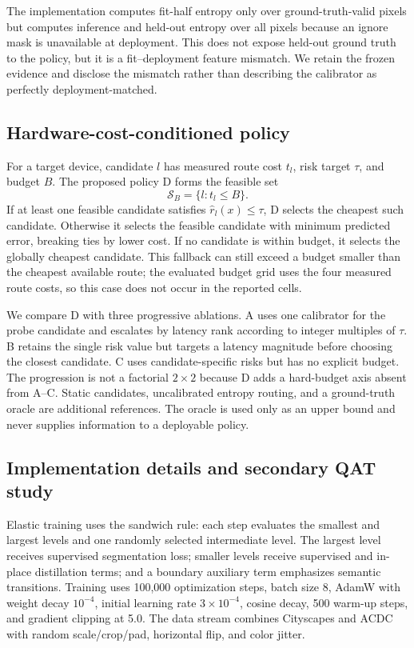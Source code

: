 \documentclass[a4paper,review,12pt]{elsarticle}
\begin{document}
The implementation computes fit-half entropy only over ground-truth-valid pixels but computes inference and held-out entropy over all pixels because an ignore mask is unavailable at deployment. This does not expose held-out ground truth to the policy, but it is a fit--deployment feature mismatch. We retain the frozen evidence and disclose the mismatch rather than describing the calibrator as perfectly deployment-matched.

\subsection{Hardware-cost-conditioned policy}
\label{sec:policy}

For a target device, candidate $l$ has measured route cost $t_l$, risk target $\tau$, and budget $B$. The proposed policy D forms the feasible set
\begin{equation}
\mathcal{S}_B=\{l:t_l\leq B\}.
\label{eq:feasible}
\end{equation}
If at least one feasible candidate satisfies $\widehat{r}_l(x)\leq\tau$, D selects the cheapest such candidate. Otherwise it selects the feasible candidate with minimum predicted error, breaking ties by lower cost. If no candidate is within budget, it selects the globally cheapest candidate. This fallback can still exceed a budget smaller than the cheapest available route; the evaluated budget grid uses the four measured route costs, so this case does not occur in the reported cells.

We compare D with three progressive ablations. A uses one calibrator for the probe candidate and escalates by latency rank according to integer multiples of $\tau$. B retains the single risk value but targets a latency magnitude before choosing the closest candidate. C uses candidate-specific risks but has no explicit budget. The progression is not a factorial $2\times2$ because D adds a hard-budget axis absent from A--C. Static candidates, uncalibrated entropy routing, and a ground-truth oracle are additional references. The oracle is used only as an upper bound and never supplies information to a deployable policy.

\subsection{Implementation details and secondary QAT study}
\label{sec:qatmethod}

Elastic training uses the sandwich rule: each step evaluates the smallest and largest levels and one randomly selected intermediate level. The largest level receives supervised segmentation loss; smaller levels receive supervised and in-place distillation terms; and a boundary auxiliary term emphasizes semantic transitions. Training uses 100,000 optimization steps, batch size 8, AdamW with weight decay $10^{-4}$, initial learning rate $3\times10^{-4}$, cosine decay, 500 warm-up steps, and gradient clipping at 5.0. The data stream combines Cityscapes and ACDC with random scale/crop/pad, horizontal flip, and color jitter.
\end{document}
